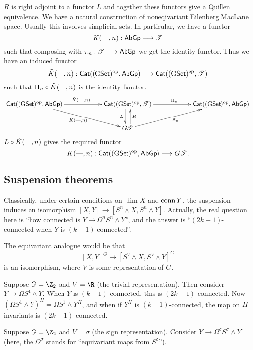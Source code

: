 \documentclass[11pt]{article}
\begin{document}
\begin{SecondWeek}
$R$ is right adjoint to a functor $L$ and together these functors give a Quillen equivalence. We have a natural construction of noneqivariant Eilenberg MacLane space. Usually this involves simplicial sets. In particular, we have a functor
\[K(\textup{---},n):\operatorname{{\mathsf{AbGp}}}\longrightarrow\mathscr{T}\]
such that composing with $\pi_n:\mathscr{T}\longrightarrow\operatorname{{\mathsf{AbGp}}}$ we get the identity functor. Thus we have an induced functor
\[\tilde{K}(\textup{---},n):\operatorname{{\mathsf{Cat}}}((\operatorname{{G\mathsf{Set}}})^{\textup{op}},\operatorname{{\mathsf{AbGp}}})\longrightarrow
\operatorname{{\mathsf{Cat}}}((\operatorname{{G\mathsf{Set}}})^{\textup{op}},\mathscr{T})\]
such that $\Pi_n\circ\tilde{K}(\textup{---},n)$ is the identity functor.
\[\xymatrixcolsep{5pc}\xymatrix{
\Cat
((\GSet)^{\textup{op}},\AbGp)
\ar[r]^{\tilde{K}(\DASH,n)}\ar[rd]_{K(\DASH,n)}
&\Cat
((\GSet)^{\textup{op}},\mathscr{T})\ar[r]^{\Pi_n}\ar@<-1ex>[d]_L
&\Cat
((\GSet)^{\textup{op}},\AbGp)\\
&G\mathscr{T}\ar@<-1ex>[u]_R\ar[ru]_{\underline{\pi}_n}&}\]
$L\circ\tilde{K}(\textup{---},n)$ gives the required functor
\[K(\textup{---},n):\operatorname{{\mathsf{Cat}}}((\operatorname{{G\mathsf{Set}}})^{\textup{op}},\operatorname{{\mathsf{AbGp}}})\longrightarrow
G\mathscr{T}.\]
\subsection*{Suspension theorems}
Classically, under certain conditions on $\dim X$ and $\operatorname{conn} Y$, the suspension induces an isomorphism $[X,Y]\to[S^n\wedge X,S^n\wedge Y]$. Actually, the real question here is ``how connected is $Y\to \Omega^nS^n\wedge Y$'', and the answer is ``$(2k-1)$-connected when $Y$ is $(k-1)$-connected''.

The equivariant analogue would be that
\[[X,Y]^G\to [S^V\wedge X,S^V\wedge Y]^G\]
is an isomorphism, where $V$ is some representation of $G$.
\begin{exmp*}
Suppose $G=\Z_2$ and $V=\R$ (the trivial representation). Then consider $Y\to\Omega S^1\wedge Y$. When $Y$ is $(k-1)$-connected, this is $(2k-1)$-connected.
Now $(\Omega S^1\wedge Y)^H=\Omega S^1\wedge Y^H$, and when if $Y^H$ is $(k-1)$-connected, the map on $H$ invariants is $(2k-1)$-connected.
\end{exmp*}
\begin{exmp*}
Suppose $G=\Z_2$ and $V=\sigma$ (the sign representation). Consider $Y\to \Omega^\sigma S^\sigma\wedge Y$ (here, the $\Omega^\sigma$ stands for ``equivariant maps from $S^\sigma$'').
\end{exmp*}
\end{SecondWeek}
\end{document}
